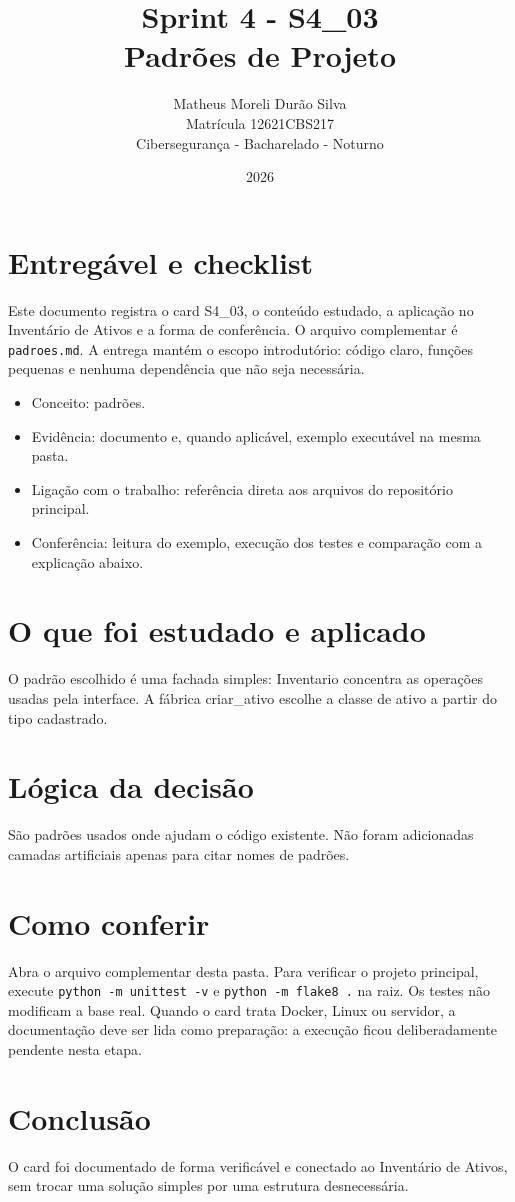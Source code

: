 \documentclass[12pt]{article}
\title{Sprint 4 - S4\_03\\Padrões de Projeto}
\author{Matheus Moreli Durão Silva\\ Matrícula 12621CBS217\\ Cibersegurança - Bacharelado - Noturno}
\date{2026}
\begin{document}
\maketitle

\section*{Entregável e checklist}
Este documento registra o card S4\_03, o conteúdo estudado, a aplicação no Inventário de Ativos e a forma de conferência. O arquivo complementar é \texttt{padroes.md}. A entrega mantém o escopo introdutório: código claro, funções pequenas e nenhuma dependência que não seja necessária.

\begin{itemize}
\item Conceito: padrões.
\item Evidência: documento e, quando aplicável, exemplo executável na mesma pasta.
\item Ligação com o trabalho: referência direta aos arquivos do repositório principal.
\item Conferência: leitura do exemplo, execução dos testes e comparação com a explicação abaixo.
\end{itemize}

\section*{O que foi estudado e aplicado}
O padrão escolhido é uma fachada simples: Inventario concentra as operações usadas pela interface. A fábrica criar\_ativo escolhe a classe de ativo a partir do tipo cadastrado.

\section*{Lógica da decisão}
São padrões usados onde ajudam o código existente. Não foram adicionadas camadas artificiais apenas para citar nomes de padrões.

\section*{Como conferir}
Abra o arquivo complementar desta pasta. Para verificar o projeto principal, execute \texttt{python -m unittest -v} e \texttt{python -m flake8 .} na raiz. Os testes não modificam a base real. Quando o card trata Docker, Linux ou servidor, a documentação deve ser lida como preparação: a execução ficou deliberadamente pendente nesta etapa.

\section*{Conclusão}
O card foi documentado de forma verificável e conectado ao Inventário de Ativos, sem trocar uma solução simples por uma estrutura desnecessária.
\end{document}
